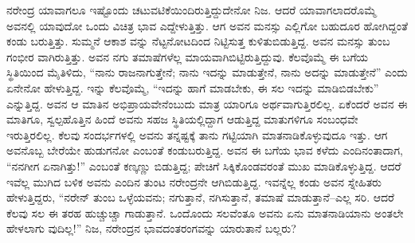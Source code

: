 ನರೇಂದ್ರ ಯಾವಾಗಲೂ ಇಷ್ಟೊಂದು ಚಟುವಟಿಕೆಯಿಂದಿರುತ್ತಿದ್ದುದೇನೋ ನಿಜ. ಆದರೆ ಯಾವಾಗಲಾದರೊಮ್ಮೆ ಅವನಲ್ಲಿ ಯಾವುದೋ ಒಂದು ವಿಚಿತ್ರ ಭಾವ ಎದ್ದೇಳುತ್ತಿತ್ತು. ಆಗ ಅವನ ಮನಸ್ಸು ಎಲ್ಲಿಗೋ ಬಹುದೂರ ಹೋಗಿದ್ದಂತೆ ಕಂಡು ಬರುತ್ತಿತ್ತು. ಸುಮ್ಮನೆ ಆಕಾಶ ವನ್ನು ನೆಟ್ಟನೋಟದಿಂದ ನಿಟ್ಟಿಸುತ್ತ ಕುಳಿತುಬಿಡುತ್ತಿದ್ದ. ಅವನ ಮನಸ್ಸು ತುಂಬ ಗಂಭೀರ ವಾಗಿರುತ್ತಿತ್ತು. ಅವನ ನಗು ತಮಾಷೆಗಳೆಲ್ಲ ಮಾಯವಾಗಿಬಿಟ್ಟಿರುತ್ತಿದ್ದುವು. ಕೆಲವೊಮ್ಮೆ ಈ ಬಗೆಯ ಸ್ಥಿತಿಯಿಂದ ಮೈತಿಳಿದು, “ನಾನು ರಾಜನಾಗುತ್ತೇನೆ; ನಾನು ಇದನ್ನು ಮಾಡುತ್ತೇನೆ, ನಾನು ಅದನ್ನು ಮಾಡುತ್ತೇನೆ” ಎಂದು ಏನೇನೋ ಹೇಳುತ್ತಿದ್ದ. ಇನ್ನು ಕೆಲವೊಮ್ಮೆ, “ಇದನ್ನು ಹಾಗೆ ಮಾಡಬೇಕು, ಈ ಸಲ ಇದನ್ನು ಮಾಡಿಬಿಡಬೇಕು” ಎನ್ನುತ್ತಿದ್ದ. ಅವನ ಆ ಮಾತಿನ ಅಭಿಪ್ರಾಯವೇನೆಂಬುದು ಮಾತ್ರ ಯಾರಿಗೂ ಅರ್ಥವಾಗುತ್ತಿರಲಿಲ್ಲ. ಏಕೆಂದರೆ ಅವನ ಈ ಮಾತಿಗೂ, ಸ್ವಲ್ಪಹೊತ್ತಿನ ಹಿಂದೆ ಅವನು ಸಹಜ ಸ್ಥಿತಿಯಲ್ಲಿದ್ದಾಗ ಆಡುತ್ತಿದ್ದ ಮಾತುಗಳಿಗೂ ಸಂಬಂಧವೇ ಇರುತ್ತಿರಲಿಲ್ಲ. ಕೆಲವು ಸಂದರ್ಭಗಳಲ್ಲಿ ಅವನು ತನ್ನಷ್ಟಕ್ಕೆ ತಾನು ಗಟ್ಟಿಯಾಗಿ ಮಾತನಾಡಿಕೊಳ್ಳುವುದೂ ಇತ್ತು. ಆಗ ಅವನೊಬ್ಬ ಬೇರೆಯೇ ಹುಡುಗನೋ ಎಂಬಂತೆ ಕಂಡುಬರುತ್ತಿದ್ದ. ಅವನ ಈ ಬಗೆಯ ಭಾವ ಕಳೆದು ಎಂದಿನಂತಾದಾಗ, “ನನಗೀಗ ಏನಾಗಿತ್ತು!” ಎಂಬಂತೆ ಕಣ್ಕಣ್ಣು ಬಿಡುತ್ತಿದ್ದ; ಪೇಚಿಗೆ ಸಿಕ್ಕಿಕೊಂಡವರಂತೆ ಮುಖ ಮಾಡಿಕೊಳ್ಳುತ್ತಿದ್ದ. ಆದರೆ ಇವೆಲ್ಲ ಮುಗಿದ ಬಳಿಕ ಅವನು ಎಂದಿನ ತುಂಟ ನರೇಂದ್ರನೇ ಆಗಿಬಿಡುತ್ತಿದ್ದ. ಇವನ್ನೆಲ್ಲ ಕಂಡು ಅವನ ಸ್ನೇಹಿತರು ಹೇಳುತ್ತಿದ್ದರು, “ನರೇನ್ ತುಂಬ ಒಳ್ಳೆಯವನು; ನಗುತ್ತಾನೆ, ನಗಿಸುತ್ತಾನೆ, ತಮಾಷೆ ಮಾಡುತ್ತಾನೆ–ಎಲ್ಲ ಸರಿ. ಆದರೆ ಕೆಲವು ಸಲ ಈ ತರಹ ಹುಚ್ಚುಚ್ಚಾ ಗಾಡುತ್ತಾನೆ. ಒಂದೊಂದು ಸಲವೆಂತೂ ಅವನು ಏನು ಮಾತನಾಡಿಯಾನು ಅಂತಲೇ ಹೇಳಲಾಗು ವುದಿಲ್ಲ!” ನಿಜ, ನರೇಂದ್ರನ ಭಾವದಂತರಂಗವನ್ನು ಯಾರುತಾನೆ ಬಲ್ಲರು?

